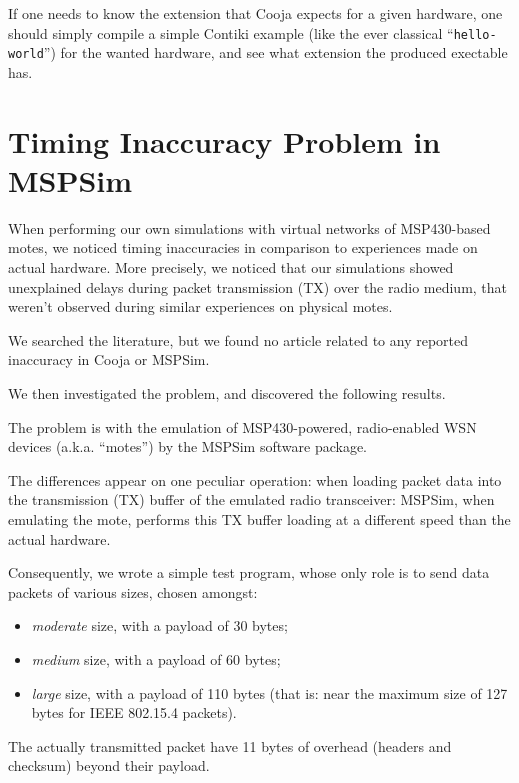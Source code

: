 \documentclass[10pt]{ewsn-proc}
\begin{document}
If one needs to know the extension that Cooja expects for a given hardware,
one should simply compile a simple Contiki example (like the ever classical
``\texttt{hello-world}'')  for the wanted hardware, and see what extension
the produced exectable has.



\section{Timing Inaccuracy Problem in MSPSim}
\label{results}

When performing our own simulations with virtual networks of MSP430-based
motes, we noticed timing inaccuracies in comparison to experiences made
on actual hardware. More precisely, we noticed that our simulations showed
unexplained delays during packet transmission (TX) over the radio medium,
that weren't observed during similar experiences on physical motes.

We searched the literature, but we found no article related to any reported
inaccuracy in Cooja or MSPSim.

We then investigated the problem, and discovered the following results.

The problem is with the emulation of MSP430-powered, radio-enabled WSN
devices (a.k.a. ``motes'') by the MSPSim software package.

The differences appear on one peculiar operation: when loading packet data
into the transmission (TX) buffer of the emulated radio transceiver:
MSPSim, when emulating the mote, performs this TX buffer loading at
a different speed than the actual hardware.

Consequently, we wrote a simple test program, whose only role is to send
data packets of various sizes, chosen amongst:
\begin{itemize}
\item \emph{moderate} size, with a payload of 30 bytes;
\item \emph{medium} size, with a payload of 60 bytes;
\item \emph{large} size, with a payload of 110 bytes (that is:
      near the maximum size of 127 bytes for IEEE 802.15.4 packets).
\end{itemize}

\medskip

The actually transmitted packet have 11 bytes of overhead (headers and
checksum) beyond their payload.
\end{document}
